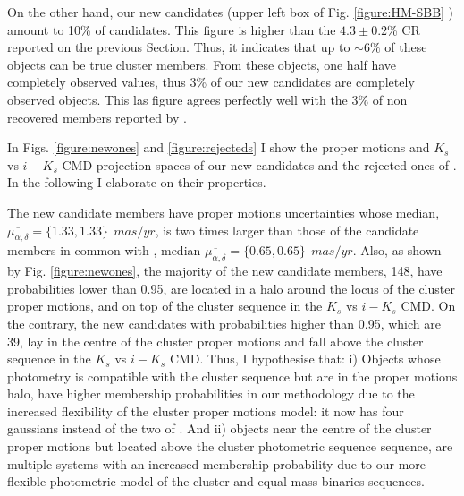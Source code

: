 On the other hand, our new candidates (upper left box of Fig. \ref{figure:HM-SBB} ) amount to 10\% of \citet{Bouy2015} candidates. This figure is higher than the $4.3\pm0.2$\% CR reported on the previous Section. Thus, it indicates that up to $\sim6\%$ of these objects can be true cluster members. From these objects, one half have completely observed values, thus 3\% of our new candidates are completely observed objects. This las figure agrees perfectly well with the 3\% of non recovered members reported by \citet{Sarro2014}. 

In Figs. \ref{figure:newones} and \ref{figure:rejecteds} I show the proper motions and $K_s$ vs $i-K_s$ CMD projection spaces of our new candidates and the rejected ones  of \citet{Bouy2015}. In the following I elaborate on their properties.

The new candidate members have proper motions uncertainties whose median, $\overline{\mu_{\alpha,\delta}}=\{1.33,1.33\} \ \ mas/yr$, is two times larger than those of the candidate members in common with \citet{Bouy2015}, median $\overline{\mu_{\alpha,\delta}}=\{0.65,0.65\} \ \ mas/yr$. Also, as shown by Fig. \ref{figure:newones}, the majority of the new candidate members, 148, have probabilities lower than 0.95, are located in a halo around the locus of the cluster proper motions, and on top of the cluster sequence in the $K_s$ vs $i-K_s$ CMD. On the contrary, the new candidates with probabilities higher than 0.95, which are 39, lay in the centre of the cluster proper motions and fall above the cluster sequence in the $K_s$ vs $i-K_s$ CMD. Thus, I hypothesise that: i) Objects whose photometry is compatible with the cluster sequence but are in the proper motions halo, have higher membership probabilities in our methodology due to the increased flexibility of the cluster proper motions model: it now has four gaussians instead of the two of \citet{Bouy2015}. And ii) objects near the centre of the cluster proper motions but located above the cluster photometric sequence sequence, are multiple systems \cite[probably triple systems which can amount to 4\% of the population][]{Duquennoy1991} with an increased membership probability due to our more flexible photometric model of the cluster and equal-mass binaries sequences.


